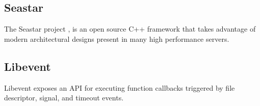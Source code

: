 \subsection{Seastar}
\label{related:seastar}
The Seastar project \cite{seastar}, is an open source C++ framework that
takes advantage of modern architectural designs present in many high
performance servers.

\subsection{Libevent}
\label{related:libevent}
Libevent \cite{libevent} exposes an API for executing function callbacks
triggered by file descriptor, signal, and timeout events.
